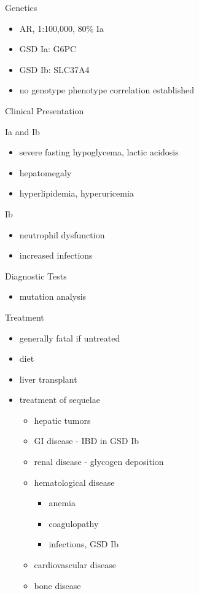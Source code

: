 \documentclass[presentation, smaller]{beamer}
\begin{document}
\begin{frame}[label={sec:orgade0a49}]{Genetics}
\begin{itemize}
\item AR, 1:100,000, 80\% Ia
\item GSD Ia: G6PC
\item GSD Ib: SLC37A4
\item no genotype phenotype correlation established
\end{itemize}
\end{frame}

\begin{frame}[label={sec:orgc9ade21}]{Clinical Presentation}
\begin{block}{Ia and Ib}
\begin{itemize}
\item severe fasting hypoglycema, lactic acidosis
\item hepatomegaly
\item hyperlipidemia, hyperuricemia
\end{itemize}
\end{block}
\begin{block}{Ib}
\begin{itemize}
\item neutrophil dysfunction
\item increased infections
\end{itemize}
\end{block}
\end{frame}

\begin{frame}[label={sec:org37cc97d}]{Diagnostic Tests}
\begin{itemize}
\item mutation analysis
\end{itemize}
\end{frame}

\begin{frame}[label={sec:orgbf57580}]{Treatment}
\begin{itemize}
\item generally fatal if untreated
\item diet
\item liver transplant
\item treatment of sequelae
\begin{itemize}
\item hepatic tumors
\item GI disease - IBD in GSD Ib
\item renal disease - glycogen deposition
\item hematological disease
\begin{itemize}
\item anemia
\item coagulopathy
\item infections, GSD Ib
\end{itemize}
\item cardiovascular disease
\item bone disease
\end{itemize}
\end{itemize}
\end{frame}
\end{document}
